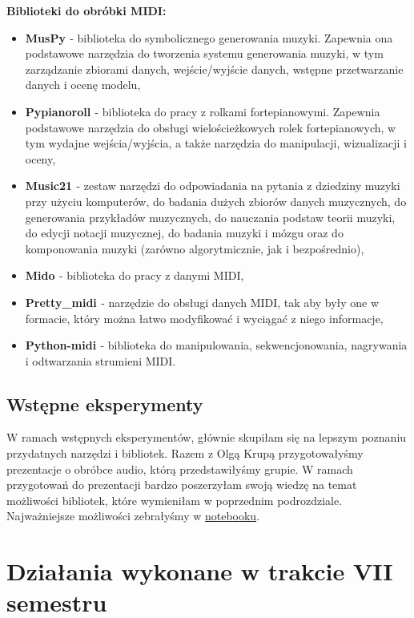 \documentclass[a4paper,titleauthor]{mwart}
\begin{document}
\textbf{Biblioteki do obróbki MIDI:}
\begin{itemize}
    \item \textbf{MusPy \cite{MusPy}} -  biblioteka do symbolicznego generowania muzyki. Zapewnia ona podstawowe narzędzia do tworzenia systemu generowania muzyki, w tym zarządzanie zbiorami danych, wejście/wyjście danych, wstępne przetwarzanie danych i ocenę modelu,
    \item \textbf{Pypianoroll \cite{Pypianoroll}} - biblioteka do pracy z rolkami fortepianowymi. Zapewnia podstawowe narzędzia do obsługi wielościeżkowych rolek fortepianowych, w tym wydajne wejścia/wyjścia, a także narzędzia do manipulacji, wizualizacji i oceny,
    \item \textbf{Music21 \cite{Music21}} - zestaw narzędzi do odpowiadania na pytania z dziedziny muzyki przy użyciu komputerów, do badania dużych zbiorów danych muzycznych, do generowania przykładów muzycznych, do nauczania podstaw teorii muzyki, do edycji notacji muzycznej, do badania muzyki i mózgu oraz do komponowania muzyki (zarówno algorytmicznie, jak i bezpośrednio),
    \item \textbf{Mido \cite{Mido}} - biblioteka do pracy z danymi MIDI,
    \item \textbf{Pretty\_midi \cite{prettymidi}} - narzędzie do obsługi danych MIDI, tak aby były one w formacie, który można łatwo modyfikować i wyciągać z niego informacje,
    \item \textbf{Python-midi \cite{pythonmidi}} - biblioteka do manipulowania, sekwencjonowania, nagrywania i odtwarzania strumieni MIDI.
\end{itemize}


\subsection{Wstępne eksperymenty}
W ramach wstępnych eksperymentów, głównie skupiłam się na lepszym poznaniu przydatnych narzędzi i bibliotek. Razem z Olgą Krupą przygotowałyśmy prezentacje o obróbce audio, którą przedstawiłyśmy grupie. W ramach przygotowań do prezentacji bardzo poszerzyłam swoją wiedzę na temat możliwości bibliotek, które wymieniłam w poprzednim podrozdziale. Najważniejsze możliwości zebrałyśmy w \href{https://colab.research.google.com/drive/10R--YsNZOqnLUOtYypPCWV8BQW43dE2M?usp=sharing&fbclid=IwAR24x1rlG_fVO6I_3hVNAZ-NS7AMBjdRKEd_XsMV4M0SlSmgR_Saf-VVemg#scrollTo=aqfV3JdiHx1E}{notebooku}.

\section{Działania wykonane w trakcie VII semestru}
\end{document}
